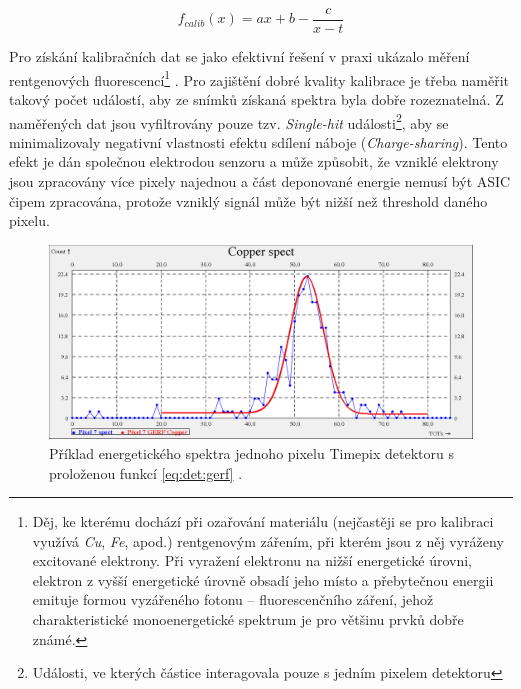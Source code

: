 \begin{equation}\label{eq:det:energyCalib}
	f_{calib}(x) = ax + b - \frac{c}{x-t}
\end{equation}

Pro získání kalibračních dat se jako efektivní řešení v praxi ukázalo měření rentgenových fluorescencí\footnote{Děj, ke kterému dochází při ozařování materiálu (nejčastěji se pro kalibraci využívá \textit{Cu}, \textit{Fe},  apod.) rentgenovým zářením, při kterém jsou z něj vyráženy excitované elektrony. Při vyražení elektronu na nižší energetické úrovni, elektron z vyšší energetické úrovně obsadí jeho místo a přebytečnou energii emituje formou vyzářeného fotonu -- fluorescenčního záření, jehož charakteristické monoenergetické spektrum je pro většinu prvků dobře známé.} \cite{Jakubek-radiography_and_charge_sharing}. Pro zajištění dobré kvality kalibrace je třeba naměřit takový počet událostí, aby ze snímků získaná spektra byla dobře rozeznatelná. Z naměřených dat jsou vyfiltrovány pouze tzv. \textit{Single-hit} události\footnote{Události, ve kterých částice interagovala pouze s jedním pixelem detektoru}, aby se minimalizovaly negativní vlastnosti efektu sdílení náboje (\textit{Charge-sharing}). Tento efekt je dán společnou elektrodou senzoru a může způsobit, že  vzniklé elektrony jsou zpracovány více pixely najednou a část deponované energie nemusí být ASIC čipem zpracována, protože vzniklý signál může být nižší než threshold daného pixelu.

\begin{figure}[th]
	\begin{center}
		\includegraphics[width=15cm]{figures/calib_gerf.png}
		\caption{Příklad energetického spektra jednoho pixelu Timepix detektoru s proloženou funkcí \ref{eq:det:gerf} \cite{BegeraBcThesis2016}.}
		\label{fig:det:calib:gerf}
	\end{center}
\end{figure}

